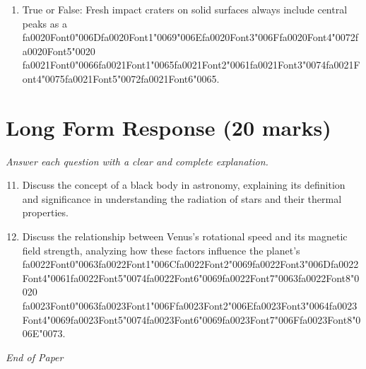 \documentclass[12pt]{article}
\begin{document}
\begin{enumerate}[label=\arabic*.]
\item True or False: Fresh impact craters on solid surfaces always include central peaks as a {\csname fa0020Font0\endcsname\char"006D}{\csname fa0020Font1\endcsname\char"0069}{\char"006E}{\csname fa0020Font3\endcsname\char"006F}{\csname fa0020Font4\endcsname\char"0072}{\csname fa0020Font5\endcsname\char"0020} {\csname fa0021Font0\endcsname\char"0066}{\csname fa0021Font1\endcsname\char"0065}{\csname fa0021Font2\endcsname\char"0061}{\csname fa0021Font3\endcsname\char"0074}{\csname fa0021Font4\endcsname\char"0075}{\csname fa0021Font5\endcsname\char"0072}{\csname fa0021Font6\endcsname\char"0065}.
\end{enumerate}

\section*{Long Form Response (20 marks)}
\textit{Answer each question with a clear and complete explanation.}
\begin{enumerate}[label=\arabic*.]
\setcounter{enumi}{10}
\item Discuss the concept of a black body in astronomy, explaining its definition and
significance in understanding the radiation of stars and their thermal properties.
\item Discuss the relationship between Venus's rotational speed and its magnetic field strength,
analyzing how these factors influence the planet's {\csname fa0022Font0\endcsname\char"0063}{\csname fa0022Font1\endcsname\char"006C}{\csname fa0022Font2\endcsname\char"0069}{\csname fa0022Font3\endcsname\char"006D}{\csname fa0022Font4\endcsname\char"0061}{\csname fa0022Font5\endcsname\char"0074}{\csname fa0022Font6\endcsname\char"0069}{\csname fa0022Font7\endcsname\char"0063}{\csname fa0022Font8\endcsname\char"0020} {\csname fa0023Font0\endcsname\char"0063}{\csname fa0023Font1\endcsname\char"006F}{\csname fa0023Font2\endcsname\char"006E}{\csname fa0023Font3\endcsname\char"0064}{\csname fa0023Font4\endcsname\char"0069}{\csname fa0023Font5\endcsname\char"0074}{\csname fa0023Font6\endcsname\char"0069}{\csname fa0023Font7\endcsname\char"006F}{\csname fa0023Font8\endcsname\char"006E}{\char"0073}.
\end{enumerate}

\vfill
\noindent\textit{End of Paper}
\end{document}
